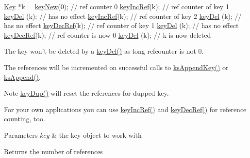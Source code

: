 \begin{DoxyCodeInclude}
\hyperlink{classkdb_1_1Key_a5679f5cae63caddd64a60388b9cc77fa}{Key} *k = \hyperlink{group__key_gad23c65b44bf48d773759e1f9a4d43b89}{keyNew}(0); \textcolor{comment}{// ref counter 0}
\hyperlink{group__key_ga6970a6f254d67af7e39f8e469bb162f1}{keyIncRef}(k); \textcolor{comment}{// ref counter of key 1}
\hyperlink{group__key_ga3df95bbc2494e3e6703ece5639be5bb1}{keyDel} (k);   \textcolor{comment}{// has no effect}
\hyperlink{group__key_ga6970a6f254d67af7e39f8e469bb162f1}{keyIncRef}(k); \textcolor{comment}{// ref counter of key 2}
\hyperlink{group__key_ga3df95bbc2494e3e6703ece5639be5bb1}{keyDel} (k);   \textcolor{comment}{// has no effect}
\hyperlink{group__key_ga2c6433ca22109e4e141946057eccb283}{keyDecRef}(k); \textcolor{comment}{// ref counter of key 1}
\hyperlink{group__key_ga3df95bbc2494e3e6703ece5639be5bb1}{keyDel} (k);   \textcolor{comment}{// has no effect}
\hyperlink{group__key_ga2c6433ca22109e4e141946057eccb283}{keyDecRef}(k); \textcolor{comment}{// ref counter is now 0}
\hyperlink{group__key_ga3df95bbc2494e3e6703ece5639be5bb1}{keyDel} (k); \textcolor{comment}{// k is now deleted}
\end{DoxyCodeInclude}
 The key won't be deleted by a \hyperlink{group__key_ga3df95bbc2494e3e6703ece5639be5bb1}{key\+Del()} as long refcounter is not 0.

The references will be incremented on successful calls to \hyperlink{group__keyset_gaa5a1d467a4d71041edce68ea7748ce45}{ks\+Append\+Key()} or \hyperlink{group__keyset_ga21eb9c3a14a604ee3a8bdc779232e7b7}{ks\+Append()}.

\begin{DoxyNote}{Note}
\hyperlink{group__key_gae6ec6a60cc4b8c1463fa08623d056ce3}{key\+Dup()} will reset the references for dupped key.
\end{DoxyNote}
For your own applications you can use \hyperlink{group__key_ga6970a6f254d67af7e39f8e469bb162f1}{key\+Inc\+Ref()} and \hyperlink{group__key_ga2c6433ca22109e4e141946057eccb283}{key\+Dec\+Ref()} for reference counting, too.


\begin{DoxyParams}{Parameters}
{\em key} & the key object to work with \\
\hline
\end{DoxyParams}
\begin{DoxyReturn}{Returns}
the number of references 
\end{DoxyReturn}


